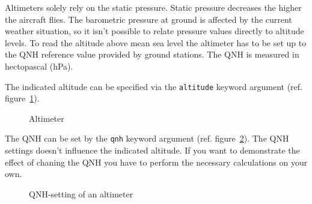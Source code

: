 Altimeters solely rely on the static pressure. Static pressure decreases the
higher the aircraft flies. The barometric pressure at ground is affected by the
current weather situation, so it isn't possible to relate pressure values
directly to altitude levels. To read the altitude above mean sea level the
altimeter has to be set up to the QNH reference value provided by ground
stations. The QNH is measured in hectopascal (\si{\hecto\Pa}).

The indicated altitude can be specified via the \texttt{altitude} keyword
argument (ref. figure~\ref{fig:inst:altimeter:basic}).

\begin{figure}[!h]
\centering
{}
\caption{Altimeter}
\label{fig:inst:altimeter:basic}
\end{figure}

The QNH can be set by the \texttt{qnh} keyword argument (ref.
figure~\ref{fig:inst:altimeter:qnh}). The QNH settings doesn't influence the
indicated altitude. If you want to demonstrate the effect of chaning the QNH
you have to perform the necessary calculations on your own.

\begin{figure}[!h]
\centering
{}
\caption{QNH-setting of an altimeter}
\label{fig:inst:altimeter:qnh}
\end{figure}
